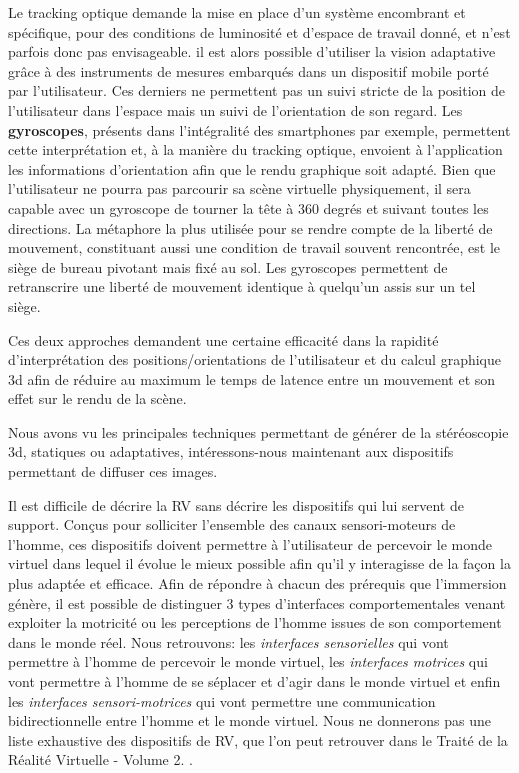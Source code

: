 Le tracking optique demande la mise en place d'un système encombrant et spécifique, pour des conditions de luminosité et d'espace de travail donné, et n'est parfois donc pas envisageable. il est alors possible d'utiliser la vision adaptative grâce à des instruments de mesures embarqués dans un dispositif mobile porté par l'utilisateur. Ces derniers ne permettent pas un suivi stricte de la position de l'utilisateur dans l'espace mais un suivi de l'orientation de son regard. Les \textbf{gyroscopes}, présents dans l'intégralité des smartphones par exemple, permettent cette interprétation et, à la manière du tracking optique, envoient à l'application les informations d'orientation afin que le rendu graphique soit adapté. Bien que l'utilisateur ne pourra pas parcourir sa scène virtuelle physiquement, il sera capable avec un gyroscope de tourner la tête à 360 degrés et suivant toutes les directions. La métaphore la plus utilisée pour se rendre compte de la liberté de mouvement, constituant aussi une condition de travail souvent rencontrée, est le siège de bureau pivotant mais fixé au sol. Les gyroscopes permettent de retranscrire une liberté de mouvement identique à quelqu'un assis sur un tel siège. 

Ces deux approches demandent une certaine efficacité dans la rapidité d'interprétation des positions/orientations de l'utilisateur et du calcul graphique 3d afin de réduire au maximum le temps de latence entre un mouvement et son effet sur le rendu de la scène.  

Nous avons vu les principales techniques permettant de générer de la stéréoscopie 3d, statiques ou adaptatives, intéressons-nous maintenant aux dispositifs permettant de diffuser ces images.

 \label{dispositifs_RV}


Il est difficile de décrire la RV sans décrire les dispositifs qui lui servent de support. Conçus pour solliciter l'ensemble des canaux sensori-moteurs de l'homme, ces dispositifs doivent permettre à l'utilisateur de percevoir le monde virtuel dans lequel il évolue le mieux possible afin qu'il y interagisse de la façon la plus adaptée et efficace.
Afin de répondre à chacun des prérequis que l'immersion génère, il est possible de distinguer 3 types d'interfaces comportementales venant exploiter la motricité ou les perceptions de l'homme issues de son comportement dans le monde réel.
Nous retrouvons: les \textit{interfaces sensorielles} qui vont permettre à l'homme de percevoir le monde virtuel, les \textit{interfaces motrices} qui vont permettre à l'homme de se séplacer et d'agir dans le monde virtuel et enfin les \textit{interfaces sensori-motrices} qui vont permettre une communication bidirectionnelle entre l'homme et le monde virtuel.
Nous ne donnerons pas une liste exhaustive des dispositifs de RV, que l'on peut retrouver dans le Traité de la Réalité Virtuelle - Volume 2. \cite{fuchs2006traite}.

